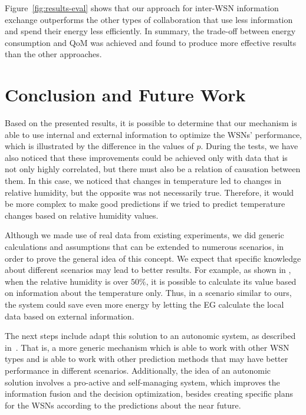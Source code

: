 \documentclass{llncs}
\begin{document}
Figure~\ref{fig:results-eval} shows that our approach for inter-WSN information 
exchange outperforms the other types of collaboration that use less information 
and spend their energy less efficiently. In summary, the trade-off between 
energy consumption and QoM was achieved and found to produce more effective 
results than the other approaches.









\section{Conclusion and Future Work}
\label{sec:conclusion}

Based on the presented results, it is possible to determine that our mechanism 
is able to use internal and external information to optimize the WSNs' 
performance, which is illustrated by the difference in the values of $p$. During 
the tests, we have also noticed that these improvements could be achieved only 
with data that is not only highly correlated, but there must also be a relation 
of causation between them. 
In this case, we noticed that changes in temperature led to changes in relative 
humidity, but the opposite was not necessarily true. Therefore, it would be 
more complex to make good predictions if we tried to predict 
temperature changes based on relative humidity values.

Although we made use of real data from existing experiments, we did generic 
calculations and assumptions that can be extended to numerous scenarios, in 
order to prove the general idea of this concept. We expect that specific 
knowledge about different scenarios may lead to better results. For example, as 
shown in \cite{Lawrence2005}, when the relative humidity is over $50\%$, it is 
possible to calculate its value based on information about the temperature 
only. Thus, in a scenario similar to ours, the system could save 
even more energy by letting the EG calculate the local data based on 
external information.




The next steps include adapt this solution to an autonomic system, as described 
in~\cite{6583430}. That is, a more generic mechanism which is able to work with 
other WSN types and is able to work with other prediction methods that may have 
better performance in different scenarios.
Additionally, the idea of an autonomic solution involves a pro-active and 
self-managing system, which improves the information fusion and the decision 
optimization, besides creating specific plans for the WSNs according to the 
predictions about the near future.
\end{document}
